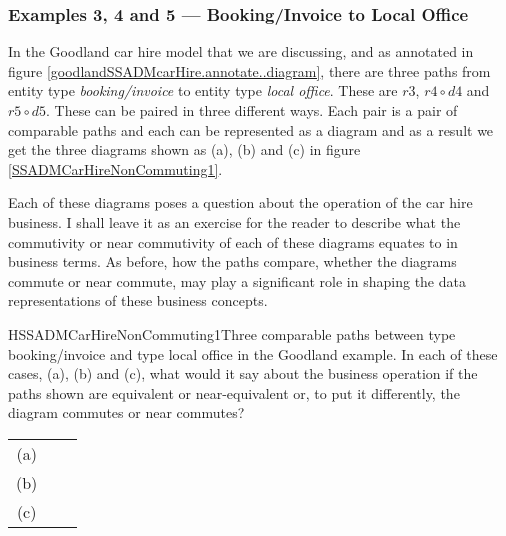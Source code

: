 \subsubsection{Examples 3, 4 and 5 --- Booking/Invoice to Local Office}


In the Goodland car hire model that we are discussing,  and as annotated in figure \ref{goodlandSSADMcarHire.annotate..diagram}, 
there are three paths from entity type \textit{booking/invoice} to entity type \textit{local office}.
These are $r3$, $r4 \circ d4$ and $r5 \circ d5$. 
These can be paired in three different ways. 
Each pair is a pair of comparable paths and each can be represented as a diagram and as a result we get the three diagrams 
shown as (a), (b) and (c) in figure \ref{SSADMCarHireNonCommuting1}.

Each of these diagrams poses a question about the operation of the car hire business.
I shall leave it as
an exercise for the reader to describe what the commutivity or near commutivity of each of these diagrams equates to in business terms.
As before, how the paths compare, whether the diagrams commute or near commute, may play a significant role in  shaping the data representations of these business concepts.

\begin{erboxedFigure}{H}{SSADMCarHireNonCommuting1}{Three comparable paths between type booking/invoice and type local office in the Goodland example. 
In each of these cases, (a), (b) and (c), what  would it say about the business operation if the paths 
shown are equivalent or near-equivalent or, to put it differently, the diagram commutes or near commutes?
}
\begin{tabular}{c p{1cm} c}
(a) &&  \\
(b) &&  \\
(c) && 
\end{tabular}
\end{erboxedFigure}

